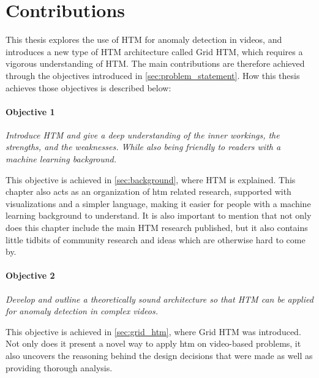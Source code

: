 \section{Contributions}
This thesis explores the use of HTM for anomaly detection in videos, and introduces a new type of HTM architecture called Grid HTM, which requires a vigorous understanding of HTM. The main contributions are therefore achieved through the objectives introduced in \autoref{sec:problem_statement}. How this thesis achieves those objectives is described below:
\paragraph*{Objective 1} \emph{Introduce HTM and give a deep understanding of the inner workings, the strengths, and the weaknesses. While also being friendly to readers with a machine learning background.}
\par
This objective is achieved in \autoref{sec:background}, where HTM is explained. This chapter also acts as an organization of  \gls*{htm} related research, supported with visualizations and a simpler language, making it easier for people with a machine learning background to understand. It is also important to mention that not only does this chapter include the main HTM research published, but it also contains little tidbits of community research and ideas which are otherwise hard to come by.
\paragraph*{Objective 2} \emph{Develop and outline a theoretically sound architecture so that HTM can be applied for anomaly detection in complex videos.}
\par
This objective is achieved in \autoref{sec:grid_htm}, where Grid HTM was introduced. Not only does it present a novel way to apply  \gls*{htm} on video-based problems, it also uncovers the reasoning behind the design decisions that were made as well as providing thorough analysis.
